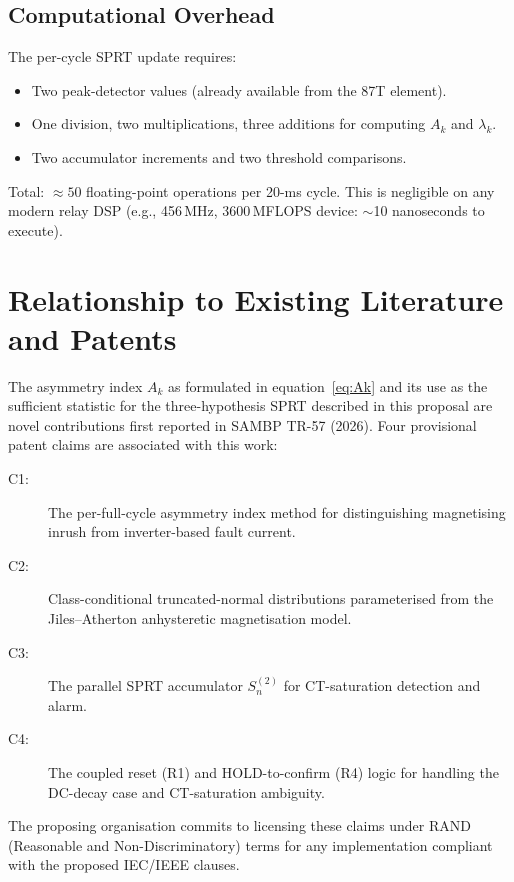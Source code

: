 \documentclass[11pt, a4paper]{article}
\begin{document}
\subsection{Computational Overhead}

The per-cycle SPRT update requires:
\begin{itemize}
  \item Two peak-detector values (already available from the 87T element).
  \item One division, two multiplications, three additions for computing
    $A_k$ and $\lambda_k$.
  \item Two accumulator increments and two threshold comparisons.
\end{itemize}
Total: $\approx 50$ floating-point operations per 20-ms cycle.  This is
negligible on any modern relay DSP (e.g., 456\,MHz, 3600\,MFLOPS device:
$\sim$10 nanoseconds to execute).

\section{Relationship to Existing Literature and Patents}

The asymmetry index $A_k$ as formulated in equation~\eqref{eq:Ak} and its
use as the sufficient statistic for the three-hypothesis SPRT described in
this proposal are novel contributions first reported in SAMBP TR-57 (2026).
Four provisional patent claims are associated with this work:
\begin{description}
  \item[C1:] The per-full-cycle asymmetry index method for distinguishing
    magnetising inrush from inverter-based fault current.
  \item[C2:] Class-conditional truncated-normal distributions parameterised
    from the Jiles--Atherton anhysteretic magnetisation model.
  \item[C3:] The parallel SPRT accumulator $S^{(2)}_n$ for CT-saturation
    detection and alarm.
  \item[C4:] The coupled reset (R1) and HOLD-to-confirm (R4) logic for
    handling the DC-decay case and CT-saturation ambiguity.
\end{description}

The proposing organisation commits to licensing these claims under
RAND (Reasonable and Non-Discriminatory) terms for any implementation
compliant with the proposed IEC/IEEE clauses.
\end{document}
